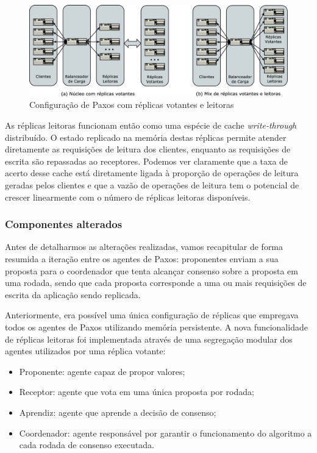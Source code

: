 \begin{figure}[ht]
  \begin{center}
    \includegraphics[width=16cm]{conteudo/capitulos/figuras/configuracao_replicas_leitoras.eps}
  \end{center}
  \caption{Configuração de Paxos com réplicas votantes e leitoras}
  \label{fig:configuracao_replicas_leitoras}
\end{figure}

As réplicas leitoras funcionam então como uma espécie de cache \emph{write-through}
distribuído. O estado replicado na memória destas réplicas permite atender diretamente as
requisições de leitura dos clientes, enquanto as requisições de escrita são repassadas ao
receptores. Podemos ver claramente que a taxa de acerto desse cache está diretamente
ligada à proporção de operações de leitura geradas pelos clientes e que a vazão de
operações de leitura tem o potencial de crescer linearmente com o número de réplicas
leitoras disponíveis.

\subsubsection{Componentes alterados}

Antes de detalharmos as alterações realizadas, vamos recapitular de forma resumida a
iteração entre os agentes de Paxos: proponentes enviam a sua proposta para o coordenador
que tenta alcançar consenso sobre a proposta em uma rodada, sendo que cada proposta
corresponde a uma ou mais requisições de escrita da aplicação sendo replicada.

Anteriormente, era possível uma única configuração de réplicas que empregava todos os
agentes de Paxos utilizando memória persistente. A nova funcionalidade de réplicas
leitoras foi implementada através de uma segregação modular dos agentes utilizados por uma
réplica votante:

\begin{itemize}
  \item Proponente: agente capaz de propor valores;
  \item Receptor: agente que vota em uma única proposta por rodada;
  \item Aprendiz: agente que aprende a decisão de consenso;
  \item Coordenador: agente responsável por garantir o funcionamento do algoritmo a cada
    rodada de consenso executada.
\end{itemize}

